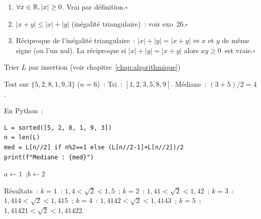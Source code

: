 
\begin{enumerate}
  \item $\forall x\in\mathbb{R}, |x|\geq0$. Vrai par d\'efinition.\hfill$\square$
  \item $|x+y|\leq|x|+|y|$ (in\'egalit\'e triangulaire)~: voir exo~26.\hfill$\square$
  \item R\'eciproque de l'in\'egalit\'e triangulaire~:
        $|x|+|y|=|x+y|\Leftrightarrow x$ et $y$ de m\^eme signe (ou l'un nul).
        La r\'eciproque \og si $|x|+|y|=|x+y|$ alors $xy\geq0$\fg\ est vraie.\hfill$\square$
\end{enumerate}


\begin{algorithm}[H]
\caption{Tri insertion + m\'ediane}
Trier $L$ par insertion (voir chapitre~\ref{chap:algorithmique})\;
\end{algorithm}

Test sur $\{5,2,8,1,9,3\}$ ($n=6$)~:
Tri~: $[1,2,3,5,8,9]$.
M\'ediane~: $(3+5)/2=4$.

En Python~:
\begin{lstlisting}[style=python]
L = sorted([5, 2, 8, 1, 9, 3])
n = len(L)
med = L[n//2] if n%2==1 else (L[n//2-1]+L[n//2])/2
print(f"Mediane : {med}")
\end{lstlisting}


\begin{algorithm}[H]
\caption{Encadrement de $\sqrt{2}$ \`a $10^{-k}$}
$a\leftarrow1$~;\quad $b\leftarrow2$\;
\end{algorithm}

R\'esultats~:
$k=1$~: $1{,}4<\sqrt{2}<1{,}5$~;
$k=2$~: $1{,}41<\sqrt{2}<1{,}42$~;
$k=3$~: $1{,}414<\sqrt{2}<1{,}415$~;
$k=4$~: $1{,}4142<\sqrt{2}<1{,}4143$~;
$k=5$~: $1{,}41421<\sqrt{2}<1{,}41422$.


